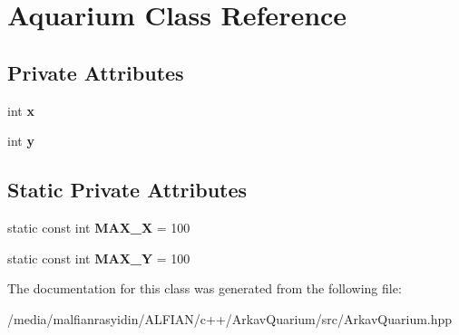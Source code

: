 \hypertarget{class_aquarium}{}\section{Aquarium Class Reference}
\label{class_aquarium}
\subsection*{Private Attributes}
\begin{DoxyCompactItemize}
\item 
\mbox{\label{class_aquarium_a480db476e4c62948bc803371a3a57708}} 
int {\bfseries x}
\item 
\mbox{\label{class_aquarium_a141ee2e1296df314fefc07407d50d56a}} 
int {\bfseries y}
\end{DoxyCompactItemize}
\subsection*{Static Private Attributes}
\begin{DoxyCompactItemize}
\item 
\mbox{\label{class_aquarium_a9ed1bde466f595a1ed92f5443d0f8efd}} 
static const int {\bfseries M\+A\+X\+\_\+X} = 100
\item 
\mbox{\label{class_aquarium_a391505700de06b370655b379cc5b0421}} 
static const int {\bfseries M\+A\+X\+\_\+Y} = 100
\end{DoxyCompactItemize}


The documentation for this class was generated from the following file\+:\begin{DoxyCompactItemize}
\item 
/media/malfianrasyidin/\+A\+L\+F\+I\+A\+N/c++/\+Arkav\+Quarium/src/Arkav\+Quarium.\+hpp\end{DoxyCompactItemize}
